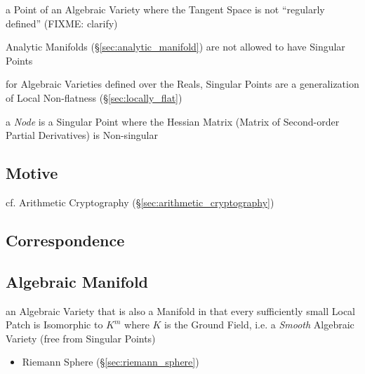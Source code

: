 a Point of an Algebraic Variety where the Tangent Space is not ``regularly
defined'' (FIXME: clarify)

Analytic Manifolds (\S\ref{sec:analytic_manifold}) are not allowed to have
Singular Points

for Algebraic Varieties defined over the Reals, Singular Points are a
generalization of Local Non-flatness (\S\ref{sec:locally_flat})

a \emph{Node} is a Singular Point where the Hessian Matrix (Matrix of
Second-order Partial Derivatives) is Non-singular



\subsection{Motive}\label{sec:motive}

cf. Arithmetic Cryptography (\S\ref{sec:arithmetic_cryptography})



\subsection{Correspondence}\label{sec:variety_correspondence}

\subsection{Algebraic Manifold}\label{sec:algebraic_manifold}

an Algebraic Variety that is also a Manifold in that every sufficiently small
Local Patch is Isomorphic to $K^m$ where $K$ is the Ground Field, i.e. a
\emph{Smooth} Algebraic Variety (free from Singular Points)

\begin{itemize}
  \item Riemann Sphere (\S\ref{sec:riemann_sphere})
\end{itemize}



